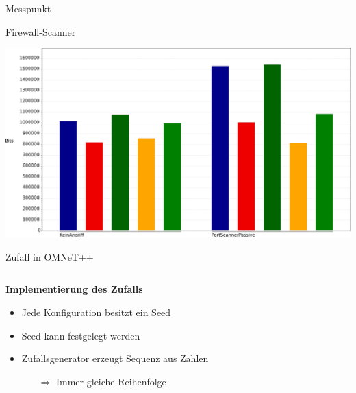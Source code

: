 \begin{frame}{Messpunkt}
	\begin{center}
		
		
	\end{center}
\end{frame}

\begin{frame}{Firewall-Scanner}
	\begin{center}
		\includegraphics[keepaspectratio,
		width=\paperwidth, 
		height=0.8\paperheight]{pic/port/PortAngriffThruput.png}
	\end{center}
\end{frame}

\begin{frame}{Zufall in OMNeT++}
	\begin{columns}[] 
		\begin{column}{0.5 \textwidth}
			\textbf{Implementierung des Zufalls}
			\begin{itemize}
				\item Jede Konfiguration besitzt ein Seed
				\item Seed kann festgelegt werden
				\item Zufallsgenerator erzeugt Sequenz aus Zahlen
				\begin{itemize}
					\item[$\Rightarrow$] Immer gleiche Reihenfolge
				\end{itemize}
			\end{itemize}
		\end{column}%
		\begin{column}{0.5 \textwidth}
			\begin{tiny}
				\begin{center}
					
				\end{center}
			\end{tiny}
		\end{column}
	\end{columns}
\end{frame}
